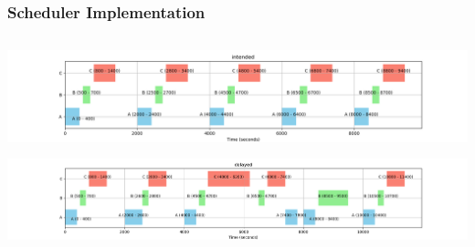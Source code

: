\documentclass{beamer}
\begin{document}
\begin{frame}
\frametitle{Scheduler Implementation}
\begin{columns}

\begin{column}{1.2\textwidth}

  \includegraphics[width=\linewidth]{intended.png}
  

  \includegraphics[width=\linewidth]{delayed.png}
\end{column}



\end{columns}
\end{frame}
\end{document}
